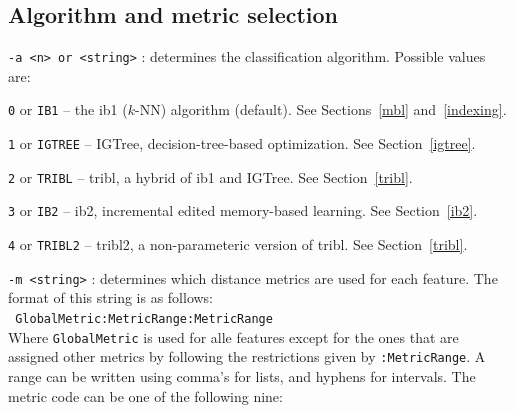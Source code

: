 \documentclass{book}
\begin{document}
\subsection{Algorithm and metric selection}

\begin{description}

\item {\tt -a <n> or <string>} : determines the classification
algorithm. Possible values are:

	\begin{description}
	\item {\tt 0} or {\tt IB1} -- the {\sc ib1} ($k$-NN) algorithm (default). See Sections~\ref{mbl} and~\ref{indexing}.
	\item {\tt 1} or {\tt IGTREE} -- {\sc IGTree}, decision-tree-based optimization. See Section~\ref{igtree}.
	\item {\tt 2} or {\tt TRIBL} -- {\sc tribl}, a hybrid of {\sc ib1} and {\sc IGTree}. See Section~\ref{tribl}.
	\item {\tt 3} or {\tt IB2} -- {\sc ib2}, incremental edited memory-based learning. See Section~\ref{ib2}.
	\item {\tt 4} or {\tt TRIBL2} -- {\sc tribl2}, a non-parameteric version of {\sc tribl}. See Section~\ref{tribl}.
	\end{description}

\item {\tt -m <string>} : determines which distance metrics are used
for each feature. The format of this string is as follows:\\ {\tt
GlobalMetric:MetricRange:MetricRange}\\ Where {\tt GlobalMetric} is
used for alle features except for the ones that are assigned other
metrics by following the restrictions given by {\tt :MetricRange}.  A
range can be written using comma's for lists, and hyphens for
intervals. The metric code can be one of the following nine:


\end{description}
\end{document}
